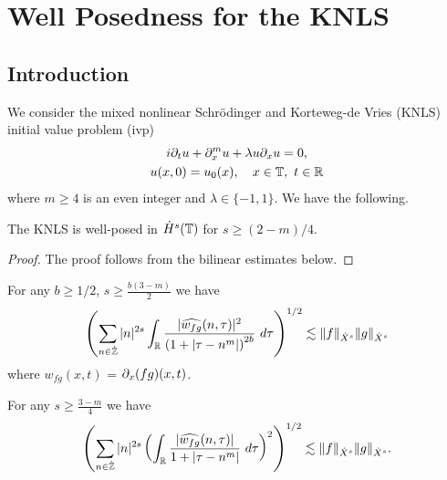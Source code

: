 \chapter{Well Posedness for the KNLS}
%
%
\section{Introduction}
We consider the mixed nonlinear Schr{\"o}dinger and Korteweg-de Vries (KNLS) initial value problem (ivp)
%
%
\begin{gather}
	\label{lKNLS-eq}
	i\partial_t u + \partial_x^{m} u + \lambda u \partial_x u = 0,
	\\
	\label{lKNLS-init-data}
	u(x,0) = u_0(x), \quad x \in \mathbb{T}, \ t \in \mathbb{R}
\end{gather}
%
%
where $m \ge 4$ is an even integer and $\lambda \in \{-1, 1\}$.
%
%
%
%
We have the following.

%
%
%
%
%
%
\begin{theorem}
	\label{lthm:main}
	The KNLS is well-posed in $\dot{H}^s(\mathbb{T})$ for $s \ge (2-m)/4$.  
\end{theorem}
%
%
\begin{proof}
  The proof follows from the bilinear estimates below.
\end{proof}
%
%
%
%
%
%
%
%
%
\begin{proposition}
	\label{lprop:prim-bilin-est}
	For any $b \ge 1/2$, $s \ge \frac{b(3-m)}{2}$ we have
	\begin{equation}
		\left( \sum_{n \in \dot{\mathbb{Z}}} |n|^{2s} \int_{\mathbb{R}}
		\frac{|\widehat{w_{fg}}(n, \tau) |^2}{\left (1+ |\tau - 
		n^{m}| \right )^{2b}} 
		 \ d \tau 
		\right)^{1/2}
		\lesssim \|f\|_{\dot{X}^s} \|g\|_{\dot{X}^s}
	\end{equation}
	where $w_{fg}(x,t)$ = $\partial_x(fg)(x,t)$.
\end{proposition}
%
%
\begin{proposition}
\label{lprop:bilinear-estimate2}
For any $s \ge \frac{3-m}{4}$ we have
%
%
\begin{equation}
	\label{ltrilinear-estimate2}
	\begin{split}
		\left( \sum_{n \in \dot{\mathbb{Z}}} |n|^{2s}  \left ( \int_{\mathbb{R}} 
		\frac{|\widehat{w_{fg}}(n, \tau) |}{1 + | \tau - n^{m } |}
		 \ d\tau \right)^2  \right)^{1/2} \lesssim \|f\|_{\dot{X}^s} \|g\|_{\dot{X}^s}.
	\end{split}
\end{equation}
\end{proposition}
%
%
%
%
%
